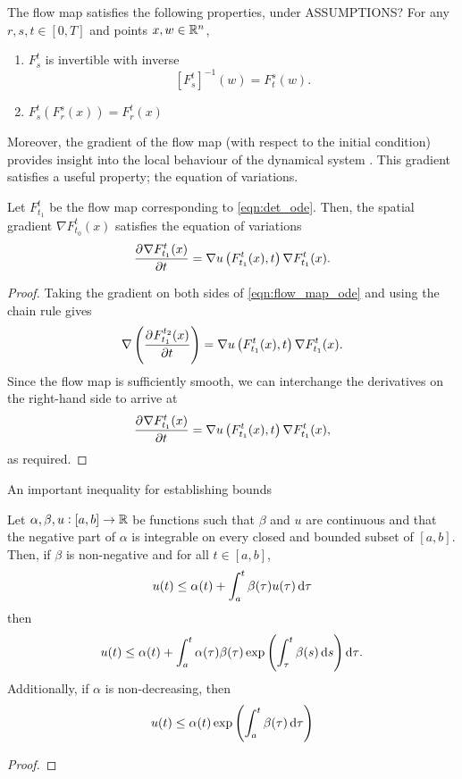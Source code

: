 The flow map satisfies the following properties, under ASSUMPTIONS?
For any \(r, s, t \in [0,T]\) and points \(x,w \in \mathbb{R}^n\),
\begin{enumerate}
	\item \(F_{s}^{t}\) is invertible with inverse
	      \[
		      \left[F_{s}^{t}\right]^{-1}\left(w\right) = F_{t}^{s}\left(w\right).
	      \]
	\item \(F_s^{t}\left(F_{r}^{s}(x)\right) = F_{r}^{t}\left(x\right)\)
\end{enumerate}
Moreover, the gradient of the flow map (with respect to the initial condition) provides insight into the local behaviour of the dynamical system \citep{Arnold_1973_OrdinaryDifferentialEquations,TruesdellNoll_2004_NonLinearFieldTheories}.
This gradient	satisfies a useful property; the equation of variations.
\begin{theorem}
	Let \(F_{t_1}^{t}\) be the flow map corresponding to \eqref{eqn:det_ode}.
	Then, the spatial gradient \(\nabla F_{t_0}^t(x)\) satisfies the equation of variations
	\begin{equation}
		\dpd{\nabla F_{t_1}^{t}(x)}{t} = \nabla u\left(F_{t_1}^{t}(x), t\right) \nabla F_{t_1}^{t}(x).
		\label{eqn:eqn_of_variations}
	\end{equation}
\end{theorem}
\begin{proof}
	Taking the gradient on both sides of \eqref{eqn:flow_map_ode} and using the chain rule gives
	\[
		\nabla\left(\dpd{F_{t_1}^{t_2}(x)}{t}\right) = \nabla u\left(F_{t_1}^{t}(x), t\right) \nabla F_{t_1}^{t}(x).
	\]
	Since the flow map is sufficiently smooth, we can interchange the derivatives on the right-hand side to arrive at
	\[
		\dpd{\nabla F_{t_1}^{t}(x)}{t} = \nabla u\left(F_{t_1}^{t}(x), t\right) \nabla F_{t_1}^{t}(x),
	\]
	as required.
\end{proof}



An important inequality for establishing bounds

\begin{theorem}\label{thm:gronwall}
	Let \(\alpha, \beta, u: [a,b] \to \mathbb{R}\) be functions such that \(\beta\) and \(u\) are continuous and that the negative part of \(\alpha\) is integrable on every closed and bounded subset of \([a,b]\).
	Then, if \(\beta\) is non-negative and for all \(t \in [a,b]\),
	\[
		u(t) \leq \alpha(t) + \int_a^t{\beta(\tau)u(\tau)\dif\tau}
	\]
	then
	\[
		u(t) \leq \alpha(t) + \int_a^t{\alpha(\tau)\beta(\tau)\exp\left(\int_\tau^{t}{\beta(s)\dif s}\right)\dif\tau}.
	\]
	Additionally, if \(\alpha\) is non-decreasing, then
	\[
		u(t) \leq \alpha(t) \exp\left(\int_a^t{\beta(\tau)\dif\tau}\right)
	\]
\end{theorem}
\begin{proof}

\end{proof}


